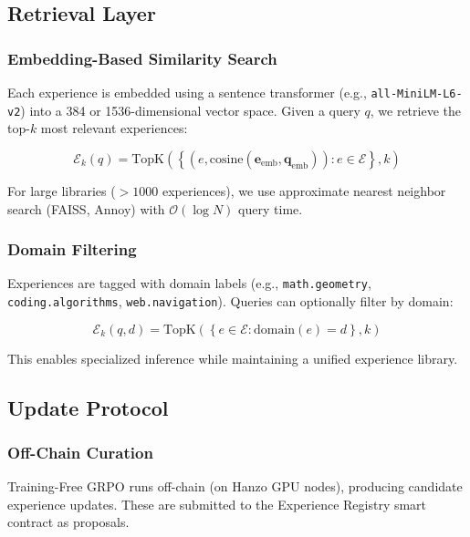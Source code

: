 \documentclass[11pt,a4paper]{article}
\begin{document}
\subsection{Retrieval Layer}

\subsubsection{Embedding-Based Similarity Search}

Each experience is embedded using a sentence transformer (e.g., \texttt{all-MiniLM-L6-v2}) into a 384 or 1536-dimensional vector space. Given a query $q$, we retrieve the top-$k$ most relevant experiences:

\begin{equation}
\mathcal{E}_k(q) = \text{TopK}\left( \left\{ (e, \text{cosine}(\mathbf{e}_{\text{emb}}, \mathbf{q}_{\text{emb}})) : e \in \mathcal{E} \right\}, k \right)
\end{equation}

For large libraries ($>1000$ experiences), we use approximate nearest neighbor search (FAISS, Annoy) with $\mathcal{O}(\log N)$ query time.

\subsubsection{Domain Filtering}

Experiences are tagged with domain labels (e.g., \texttt{math.geometry}, \texttt{coding.algorithms}, \texttt{web.navigation}). Queries can optionally filter by domain:

\begin{equation}
\mathcal{E}_k(q, d) = \text{TopK}\left( \left\{ e \in \mathcal{E} : \text{domain}(e) = d \right\}, k \right)
\end{equation}

This enables specialized inference while maintaining a unified experience library.

\subsection{Update Protocol}

\subsubsection{Off-Chain Curation}

Training-Free GRPO runs off-chain (on Hanzo GPU nodes), producing candidate experience updates. These are submitted to the Experience Registry smart contract as proposals.
\end{document}
